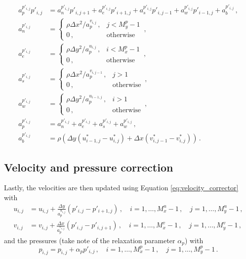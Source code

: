 \documentclass{article}
\begin{document}
\begin{subequations}
	\label{eq:pc}
	\begin{align}
	a^{p'_{i,j}}_p p'_{i,j} & = a^{p'_{i,j}}_n p'_{i, j+1} + a^{p'_{i,j}}_e p'_{i+1, j} + a^{p'_{i,j}}_s p'_{i, j-1} + a^{p'_{i,j}}_w p'_{i-1, j} + a_b^{p'_{i,j}}\,,\\
	a^{p'_{i,j}}_n & = \begin{cases}
	\rho \Delta x^2 / a_p^{v_{i, j}}\,, & j < M_y^p - 1 \\
	0\,, & \text{otherwise}
	\end{cases}\,, \\
	a^{p'_{i,j}}_e & = \begin{cases}
	\rho \Delta y^2 / a_p^{u_{i, j}}\,, & i < M_x^p - 1 \\
	0\,, & \text{otherwise}
	\end{cases}\,, \\
	a^{p'_{i,j}}_s & = \begin{cases}
	\rho \Delta x^2 / a_p^{v_{i, j - 1}}\,, & j > 1 \\
	0\,, & \text{otherwise}
	\end{cases}\,, \\
	a^{p'_{i,j}}_w & = \begin{cases}
	\rho \Delta y^2 / a_p^{u_{i - 1, j}}\,, & i > 1 \\
	0\,, & \text{otherwise}
	\end{cases}\,, \\
	a^{p'_{i,j}}_p & = a^{p'_{i,j}}_n + a^{p'_{i,j}}_e + a^{p'_{i,j}}_s + a^{p'_{i,j}}_w\,, \\
	a^{p'_{i,j}}_b & = \rho \left(\Delta y (u_{i - 1, j}^* - u^*_{i,j}) + \Delta x(v^*_{i, j - 1} - v^*_{i,j})\right)\,.
	\end{align}
\end{subequations}

\subsection{Velocity and pressure correction}
\label{subsec:correction}

Lastly, the velocities are then updated using Equation \eqref{eq:velocity_corrector} with
\begin{subequations}
	\begin{align}
	u_{i,j} & = u_{i,j} + \frac{\Delta y}{a_p^{u_{i,j}}} (p'_{i,j} - p'_{i+1,j})\,,\quad i = 1, \ldots, M_x^u - 1\,, \quad j = 1, \ldots, M_y^u - 1\,, \\
	v_{i,j} & = v_{i,j} + \frac{\Delta x}{a_p^{v_{i,j}}} (p'_{i,j} - p'_{i, j+1})\,,\quad i = 1, \ldots, M_x^v - 1\,, \quad j = 1, \ldots, M_y^v - 1\,,
	\end{align}
\end{subequations}
and the pressures  (take note of the relaxation parameter $\alpha_p$) with
\begin{equation}
p_{i,j} = p_{i,j} + \alpha_p p'_{i,j} \,,\quad i = 1, \ldots, M_x^p - 1\,, \quad j = 1, \ldots, M_y^p - 1\,.
\end{equation}
\end{document}
